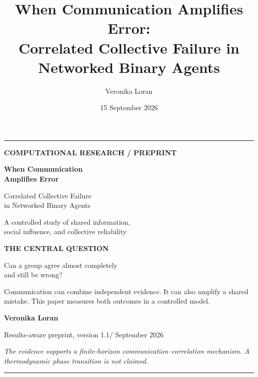 \documentclass[11pt,a4paper]{article}
\title{\textbf{When Communication Amplifies Error:}\\[0.25em]
\large Correlated Collective Failure in Networked Binary Agents}
\author{Veronika Loran}
\date{15 September 2026}
\begin{document}
\hypersetup{pageanchor=false}
\begin{titlepage}
\thispagestyle{empty}
{\color{accent}\rule{\textwidth}{2pt}}
\vspace{0.6cm}
{\small\bfseries\color{accent}\MakeUppercase{Computational research / Preprint}}\par
\vspace{1.3cm}
{\fontsize{34}{39}\selectfont\bfseries\color{ink} When Communication\\ Amplifies Error\par}
\vspace{0.7cm}
{\LARGE\color{accent} Correlated Collective Failure\\ in Networked Binary Agents\par}
\vspace{0.7cm}
{\large\color{muted} A controlled study of shared information,\\ social influence, and collective reliability\par}
\vfill
\begingroup
\setlength{\fboxsep}{16pt}
\colorbox{accentlight}{\begin{minipage}{\dimexpr\textwidth-32pt\relax}
{\small\bfseries\color{accent} THE CENTRAL QUESTION}\par\medskip
{\Large\color{ink} Can a group agree almost completely\\ and still be wrong?\par}\medskip
{\normalsize\color{muted} Communication can combine independent evidence. It can also amplify a shared mistake. This paper measures both outcomes in a controlled model.}
\end{minipage}}
\endgroup
\vfill
{\Large\bfseries\color{ink} Veronika Loran}\par
\vspace{0.3cm}
{\small\color{muted} Results-aware preprint, version 1.1\quad / September 2026}\par
\vspace{0.7cm}
{\small\itshape\color{muted} The evidence supports a finite-horizon communication--correlation mechanism. A thermodynamic phase transition is not claimed.}\par
\vspace{0.5cm}
{\color{accent}\rule{\textwidth}{2pt}}
\end{titlepage}
\end{document}
